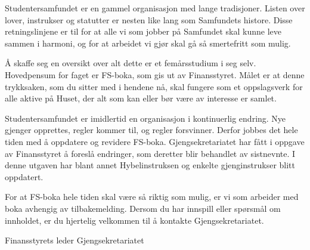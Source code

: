 \begin{forord}
Studentersamfundet er en gammel organisasjon med lange tradisjoner. Listen over lover, instrukser og statutter er
nesten like lang som Samfundets histore. Disse retningslinjene er til for at alle vi som jobber på Samfundet skal kunne
leve sammen i harmoni, og for at arbeidet vi gjør skal gå så smertefritt som mulig.

Å skaffe seg en oversikt over alt dette er et femårsstudium i seg selv. Hovedpensum for faget er FS-boka, som gis ut
av Finansstyret. Målet er at denne trykksaken, som du sitter med i hendene nå, skal fungere som et oppslagsverk for
alle aktive på Huset, der alt som kan eller bør være av interesse er samlet.

Studentersamfundet er imidlertid en organisasjon i kontinuerlig endring. Nye gjenger opprettes, regler kommer til, og
regler forsvinner. Derfor jobbes det hele tiden med å oppdatere og revidere FS-boka. Gjengsekretariatet har fått i
oppgave av Finansstyret å foreslå endringer, som deretter blir behandlet av sistnevnte. I denne utgaven har blant annet
Hybelinstruksen og enkelte gjenginstrukser blitt oppdatert.

For at FS-boka hele tiden skal være så riktig som mulig, er vi som arbeider med boka avhengig av tilbakemelding.
Dersom du har innspill eller spørsmål om innholdet, er du hjertelig velkommen til å kontakte Gjengsekretariatet.



\vfill


Finansstyrets leder \hfill Gjengsekretariatet


\end{forord}

